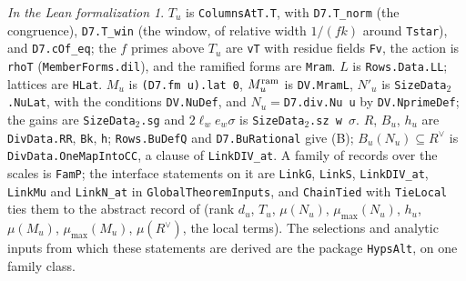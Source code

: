 \documentclass[reqno]{amsart}
\theoremstyle{definition}
\theoremstyle{plain}
\theoremstyle{remark}
\newtheorem*{leanremark}{In the Lean formalization}
\newcommand{\tl}[1]{\texttt{#1}}
\begin{document}
\begin{leanremark}
\raggedright \(T_u\) is \tl{ColumnsAtT.T}, with \tl{D7.T\_norm} (the congruence), \tl{D7.T\_win} (the window, of relative width \(1/(fk)\) around \tl{Tstar}), and \tl{D7.cOf\_eq}; the \(f\) primes above \(T_u\) are \tl{vT} with residue fields \tl{Fv}, the action is \tl{rhoT} (\tl{MemberForms.dil}), and the ramified forms are \tl{Mram}.  \(L\) is \tl{Rows.Data.LL}; lattices are \tl{HLat}.  \(M_u\) is \tl{(D7.fm u).lat 0}, \(M_u^{\rm ram}\) is \tl{DV.MramL}, \(N'_u\) is \tl{SizeData\(_2\).NuLat}, with the conditions \tl{DV.NuDef}, and \(N_u=\)\tl{D7.div.Nu u} by \tl{DV.NprimeDef}; the gains are \tl{SizeData\(_2\).sg} and \(2\ell_we_w\sigma\) is \tl{SizeData\(_2\).sz w \(\sigma\)}.  \(R\), \(B_u\), \(h_u\) are \tl{DivData.RR}, \tl{Bk}, \tl{h}; \tl{Rows.BuDefQ} and \tl{D7.BuRational} give (B); \(B_u(N_u)\subseteq R^\vee\) is \tl{DivData.OneMapIntoCC}, a clause of \tl{LinkDIV\_at}.  A family of records over the scales is \tl{FamP}; the interface statements on it are \tl{LinkG}, \tl{LinkS}, \tl{LinkDIV\_at}, \tl{LinkMu} and \tl{LinkN\_at} in \tl{GlobalTheoremInputs}, and \tl{ChainTied} with \tl{TieLocal} ties them to the abstract record of \cite[Def.~18.9]{Adr} (rank \(d_u\), \(T_u\), \(\mu(N_u)\), \(\mu_{\max}(N_u)\), \(h_u\), \(\mu(M_u)\), \(\mu_{\max}(M_u)\), \(\mu(R^\vee)\), the local terms).  The selections and analytic inputs from which these statements are derived are the package \tl{HypsAlt}, on one family class.
\end{leanremark}
\end{document}
